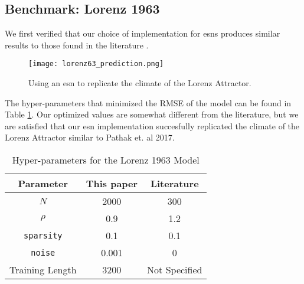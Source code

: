 \subsection{Benchmark: Lorenz 1963}

We first verified that our choice of implementation for \glspl{esn}
produces similar results to those found in the literature \cite{pathak_using_2017}.
\begin{figure}[ht]
  \texttt{[image: lorenz63\_prediction.png]}
  \caption{Using an \gls{esn} to replicate the climate of the Lorenz Attractor.}
  \label{fig:lorenz63}
\end{figure}
The hyper-parameters that minimized the RMSE of the model can be found in Table
\ref{tab:lorenzparam}. Our optimized values are somewhat different from the literature, but we are satisfied that our \gls{esn} implementation succesfully
replicated the climate of the Lorenz Attractor similar to Pathak et. al 2017.
\begin{table}[ht]
  \centering
  \caption{Hyper-parameters for the Lorenz 1963 Model}
  \label{tab:lorenzparam}
  \begin{tabular}{c|c|c}
    \hline
    Parameter & This paper & Literature \cite{pathak_using_2017}\\
    \hline
    $N$ & 2000& 300\\
    $\rho$& 0.9&1.2\\
    \texttt{sparsity}& 0.1& 0.1\\
    \texttt{noise}& 0.001& 0\\
    Training Length & 3200& Not Specified\\
  \end{tabular}
\end{table}
